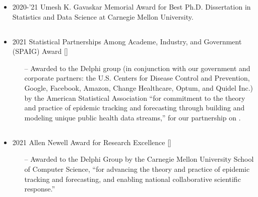 \documentclass[letterpaper,10pt]{article}
\newcommand{\myhref}[3][blue]{\href{#2}{\color{#1}{#3}}}
\begin{document}
\begin{itemize}[leftmargin=0.6cm, rightmargin=0.3cm]
\item 2020-'21 Umesh K. Gavaskar Memorial Award for Best Ph.D. Dissertation in Statistics and Data Science at Carnegie Mellon University.

\subsection*{}
\label{SPAIG}
\vspace{-1.25cm}

\item 2021 Statistical Partnerships Among Academe, Industry, and Government (SPAIG) Award [\myhref{https://magazine.amstat.org/blog/2021/10/01/2021-spaig-award/}{Link}]
\vspace{-0.1cm}
{\small
\begin{itemize}
\item[--] Awarded to the Delphi group (in conjunction with our government and corporate partners: the U.S. Centers for Disease Control and Prevention, Google, Facebook, Amazon, Change Healthcare, Optum, and Quidel Inc.) by the American Statistical Association ``for commitment to the theory and practice of epidemic tracking and forecasting through building and modeling unique public health data streams,'' for our partnership on \myhref{https://delphi.cmu.edu/covidcast/}{COVIDcast}.
\end{itemize}
}

\subsection*{}
\label{Newell}
\vspace{-1.25cm}

\item 2021 Allen Newell Award for Research Excellence [\myhref{https://www.cs.cmu.edu/news/2021/delphi-research-group-collaborators-honored-covidcast}{Link}] 
\vspace{-0.1cm}
{\small
\begin{itemize}
\item[--] Awarded to the Delphi Group by the Carnegie Mellon University School of Computer Science, ``for advancing the theory and practice of epidemic tracking and forecasting, and enabling national collaborative scientific response.'' 
\end{itemize}
}

\vspace{-0.075cm}


\end{itemize}
\end{document}
